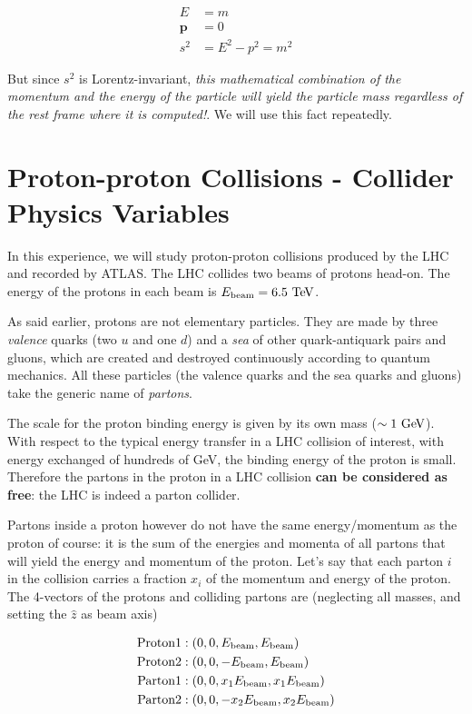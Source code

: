 \begin{align} 
E &= m \\ 
\mathbf{p} &= 0 \\ 
s^2 &= E^2 - p^2 = m^2
\end{align}

\noindent But since $s^2$ is Lorentz-invariant, \textit{this mathematical combination of the momentum and the energy of the particle will yield the particle mass regardless of the rest frame where it is computed!}. We will use this fact repeatedly.

\section{Proton-proton Collisions - Collider Physics Variables}
\label{sec:collider_physics_variables}

In this experience, we will study proton-proton collisions produced by the LHC and recorded by ATLAS. The LHC collides two beams of protons head-on. The energy of the protons in each beam is $E_{\mathrm{beam}} = 6.5\ \text{Te\kern -0.1em V}$. 

As said earlier, protons are not elementary particles. They are made by three \textit{valence} quarks (two $u$ and one $d$) and a \textit{sea} of other quark-antiquark pairs and gluons, which are created and destroyed continuously according to quantum mechanics. All these particles (the valence quarks and the sea quarks and gluons) take the generic name of \textit{partons}. 

The scale for the proton binding energy is given by its own mass ($\sim 1\ \text{Ge\kern -0.1em V}$). With respect to the typical energy transfer in a LHC collision of interest, with energy exchanged of hundreds of GeV, the binding energy of the proton is small. Therefore the partons in the proton in a LHC collision \textbf{can be considered as free}: the LHC is indeed a parton collider. 

Partons inside a proton however do not have the same energy/momentum as the proton of course: it is the sum of the energies and momenta of all partons that will yield the energy and momentum of the proton. Let's say that each parton $i$ in the collision carries a fraction $x_i$ of the momentum and energy of the proton. The 4-vectors of the protons and colliding partons are (neglecting all masses, and setting the $\hat{z}$ as beam axis) 

\begin{align}
\mathrm{Proton 1}&: \left(0,0,E_{\mathrm{beam}},E_{\mathrm{beam}}\right) \\
\mathrm{Proton 2}&: \left(0,0,-E_{\mathrm{beam}},E_{\mathrm{beam}}\right) \\
\mathrm{Parton 1}&: \left(0,0,x_1E_{\mathrm{beam}},x_1E_{\mathrm{beam}}\right) \\
\mathrm{Parton 2}&: \left(0,0,-x_2E_{\mathrm{beam}},x_2E_{\mathrm{beam}}\right) \\
\end{align}

